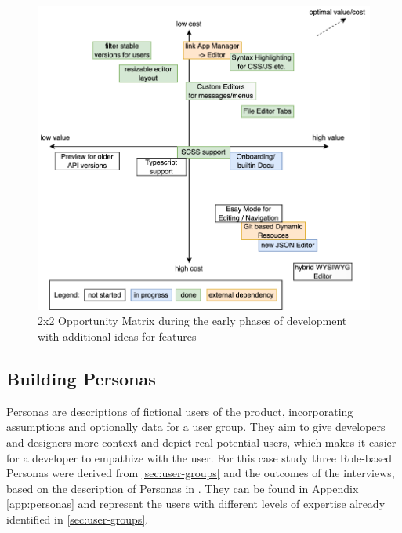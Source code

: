\begin{figure}[h!]
	\centering
  \includegraphics[width=\textwidth]{pics/feature_cost_matrix.drawio.png}
	\caption{2x2 Opportunity Matrix during the early phases of development with additional ideas for features}
	\label{fig:opportunitymatrix}
\end{figure}


\subsection{Building Personas}
\label{subsec:personas}

Personas are descriptions of fictional users of the product, incorporating assumptions and optionally data for a user group.
They aim to give developers and designers more context and depict real potential users, which makes it easier for a developer to empathize with the user.
For this case study three Role-based Personas were derived from \ref{sec:user-groups} and the outcomes of the interviews, based on the description of Personas in \cite[pp. 403-405]{Interactiondesign:2019ys}. They can be found in Appendix \ref{app:personas} and represent the users with different levels of expertise already identified in \ref{sec:user-groups}.
